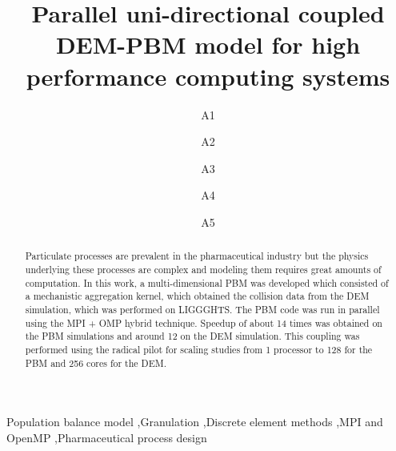 \documentclass[preprint,11pt,authoryear]{elsarticle}
\begin{document}
\begin{frontmatter}
\title{Parallel uni-directional coupled DEM-PBM model for high performance computing systems}
\author{A1 }
\author{A2 }
\author{A3 }
\author{A4 }
\author{A5} 
\address{Department of Chemical and Biochemical Engineering, Rutgers, The State University of New
Jersey, Piscataway, NJ, USA 08854}
\begin{abstract}
Particulate processes are prevalent in the pharmaceutical industry but the physics underlying these 
processes are complex and modeling them requires great amounts of computation. In this work, a 
multi-dimensional PBM was developed which consisted of a 
mechanistic aggregation kernel, which obtained the collision data from the DEM simulation, which was 
performed on LIGGGHTS. The PBM code was run in parallel using the MPI + OMP hybrid technique. 
Speedup of about 14 times was obtained on the PBM simulations and around 12 on the DEM 
simulation. This coupling was performed using the radical pilot for scaling studies from 1 processor
to 128 for the PBM and 256 cores for the DEM.
\end{abstract}
\begin{keyword}
Population balance model \sep Granulation \sep Discrete element methods  \sep MPI and OpenMP 
\sep Pharmaceutical process design
\end{keyword}
\end{frontmatter}
\linenumbers
\end{document}
